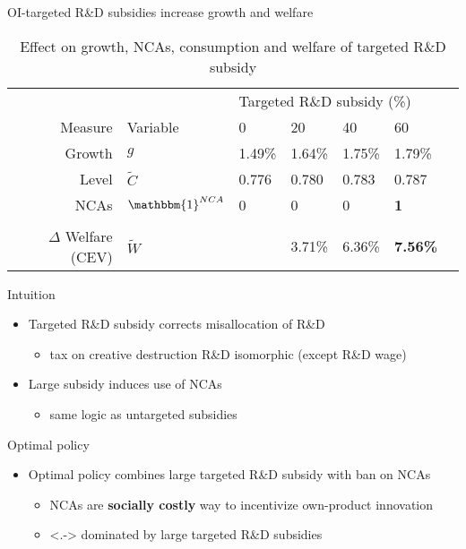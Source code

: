 \documentclass[english,usenames,dvipsnames]{beamer}
\begin{document}
\begin{frame}{OI-targeted R\&D subsidies increase growth and welfare}\label{OI_RDsubsidy_table}
	\begin{table}
		\centering
		\caption*{Effect on growth, NCAs, consumption and welfare of targeted R\&D subsidy}
		\small
		\begin{tabular}{rllllll}
			\toprule \toprule
			 &  & \multicolumn{4}{l}{Targeted R\&D subsidy (\%)} \vspace{3pt} \tabularnewline
			Measure &Variable & 0 & 20 & 40 & 60 \tabularnewline
			\midrule
			Growth & $g$ & 1.49\% & 1.64\% & 1.75\% & 1.79\% \tabularnewline
			Level & $\tilde{C}$  & 0.776 &  0.780 & 0.783 & 0.787 \tabularnewline 
			NCAs & $\mathbbm{1}^{NCA}$ & 0 & 0 & 0 & \alert{\textbf{1}} \tabularnewline
			\tabularnewline
			$\Delta$ Welfare (CEV) & $\tilde{W}$  &  & 3.71\% & 6.36\% & \alert{\textbf{7.56\%}} \tabularnewline
			\bottomrule
		\end{tabular}
	\end{table}
	\hyperlink{oi_rd_subsidies:decomposition_growth_decrease}{}
	\hyperlink{plots:oi_rd_subsidies1}{} \hyperlink{plots:oi_rd_subsidies2}{}	
\end{frame}

\begin{frame}{Intuition}\label{OI_RDsubsidy_intuition}
	\begin{itemize}
		\item <+-> Targeted R\&D subsidy corrects misallocation of R\&D
		\begin{itemize}
			\item tax on creative destruction R\&D isomorphic (except R\&D wage)
		\end{itemize}
		\smallskip
		\item <+-> Large subsidy induces use of NCAs
		\begin{itemize}
			\item same logic as untargeted subsidies
		\end{itemize}
		\smallskip
	\end{itemize}
\end{frame}

\begin{frame}{Optimal policy}\label{all_policies_overview}
	\begin{itemize}
		\item <+-> Optimal policy combines large targeted R\&D subsidy with ban on NCAs \hyperlink{plots:all_policies}{} 
		\begin{itemize}
			\item<+-> NCAs are \alert{\textbf{socially costly}} way to incentivize own-product innovation
			\item<.-> dominated by large targeted R\&D subsidies 	\hyperlink{intuition:all_policies}{}
		\end{itemize}
	\end{itemize}
\end{frame}
\end{document}
